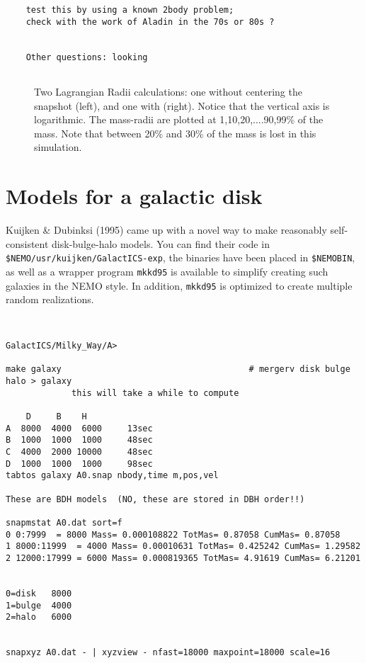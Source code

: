 \begin{itemize}
\begin{itemize}
\begin{verbatim}
    test this by using a known 2body problem; 
    check with the work of Aladin in the 70s or 80s ?


    Other questions: looking


\end{verbatim}\normalsize

\begin{figure}[htb]
\caption[Lagrangian Radii for a Cold Collapse]
{Two Lagrangian Radii calculations: one without centering the
snapshot (left), and one with (right). Notice that the vertical axis is
logarithmic. The mass-radii are plotted at
1,10,20,....90,99\% of the mass. Note that between 20\% and 30\% of the
mass is lost in this simulation.}
\end{figure}




\section{Models for a galactic disk}

Kuijken \& Dubinksi (1995) came up with a novel way to make reasonably
self-consistent disk-bulge-halo models. You can find
their code in {\tt \$NEMO/usr/kuijken/GalactICS-exp}, the binaries have
been placed in {\tt \$NEMOBIN}, as well as a wrapper program
{\tt mkkd95} is available to simplify creating such galaxies in the
NEMO style. In addition, {\tt mkkd95} is optimized to create
multiple random realizations.

\footnotesize\begin{verbatim}


GalactICS/Milky_Way/A> 

make galaxy                                     # mergerv disk bulge halo > galaxy
             this will take a while to compute

    D     B    H
A  8000  4000  6000     13sec
B  1000  1000  1000     48sec
C  4000  2000 10000     48sec
D  1000  1000  1000     98sec
tabtos galaxy A0.snap nbody,time m,pos,vel

These are BDH models  (NO, these are stored in DBH order!!)

snapmstat A0.dat sort=f
0 0:7999  = 8000 Mass= 0.000108822 TotMas= 0.87058 CumMas= 0.87058
1 8000:11999  = 4000 Mass= 0.00010631 TotMas= 0.425242 CumMas= 1.29582
2 12000:17999 = 6000 Mass= 0.000819365 TotMas= 4.91619 CumMas= 6.21201


0=disk   8000
1=bulge  4000
2=halo   6000


snapxyz A0.dat - | xyzview - nfast=18000 maxpoint=18000 scale=16


\end{verbatim}
\end{itemize}
\end{itemize}
